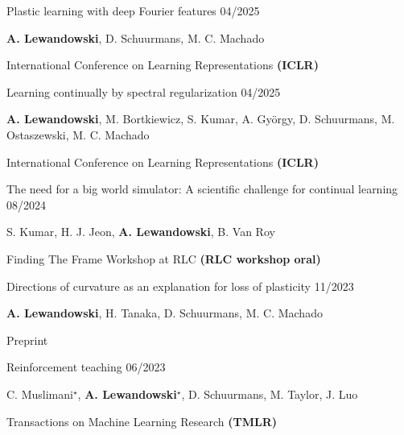 \begin{cventries}
    \pubentry
    {Plastic learning with deep Fourier features}
    {04/2025}
    {
      \vspace{-4.0mm}
      \begin{cvitems}
        \item[>>] \textbf{A. Lewandowski}, D. Schuurmans, M. C. Machado
    	\item[>>] International Conference on Learning Representations \textbf{(ICLR)}
      \end{cvitems}
    }

    \pubentry
    {Learning continually by spectral regularization}
    {04/2025}
    {
      \vspace{-4.0mm}
      \begin{cvitems}
        \item[>>] \textbf{A. Lewandowski}, M. Bortkiewicz, S. Kumar, A. György, D. Schuurmans, M. Ostaszewski, M. C. Machado
    	\item[>>] International Conference on Learning Representations \textbf{(ICLR)}
      \end{cvitems}
    }


    \pubentry
    {The need for a big world simulator: A scientific challenge for continual learning}
    {08/2024}
    {
      \vspace{-4.0mm}
      \begin{cvitems}
        \item[>>] S. Kumar, H. J. Jeon, \textbf{A. Lewandowski}, B. Van Roy
    	\item[>>] Finding The Frame Workshop at RLC \textbf{(RLC workshop oral)}
      \end{cvitems}
    }

    \pubentry
    {Directions of curvature as an explanation for loss of plasticity}
    {11/2023}
    {
      \vspace{-4.0mm}
      \begin{cvitems}
        \item[>>] \textbf{A. Lewandowski}, H. Tanaka, D. Schuurmans, M. C. Machado
    	\item[>>] Preprint
      \end{cvitems}
    }

    \pubentry
    {Reinforcement teaching}
    {06/2023}
    {
      \vspace{-4.0mm}
      \begin{cvitems}
        \item[>>] C. Muslimani$^{\star}$, \textbf{A. Lewandowski}$^\star$, D. Schuurmans, M. Taylor, J. Luo
    	\item[>>] Transactions on Machine Learning Research \textbf{(TMLR)}
      \end{cvitems}
    }


\end{cventries}
